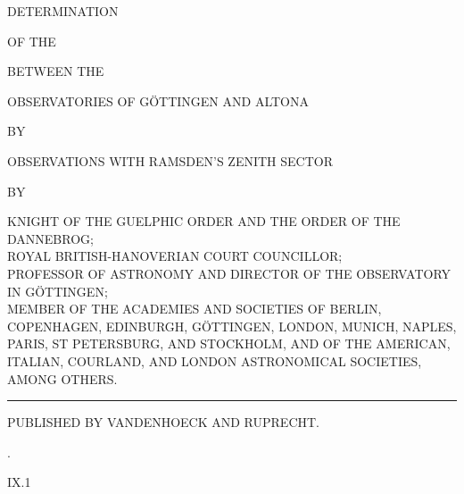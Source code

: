 \clearpage
\begin{center}
{\Large DETERMINATION}\par\vspace{8mm}
{\small OF THE}\par\vspace{8mm}
{\LARGE{}}\par\vspace{8mm}
{\small BETWEEN THE}\par\vspace{7mm}
{\large OBSERVATORIES OF GÖTTINGEN AND ALTONA}\par\vspace{7mm}
{\small BY}\par\vspace{7mm}
{\normalsize OBSERVATIONS WITH RAMSDEN'S ZENITH SECTOR}\par\vspace{7mm}
{\small BY}\par\vspace{7mm}
{\large{}}\par\smallskip
{\scriptsize
KNIGHT OF THE GUELPHIC ORDER AND THE ORDER OF THE DANNEBROG;\\
ROYAL BRITISH-HANOVERIAN COURT COUNCILLOR;\\
PROFESSOR OF ASTRONOMY AND DIRECTOR OF THE OBSERVATORY IN GÖTTINGEN;\\
MEMBER OF THE ACADEMIES AND SOCIETIES OF BERLIN, COPENHAGEN, EDINBURGH, GÖTTINGEN,
LONDON, MUNICH, NAPLES, PARIS, ST PETERSBURG, AND STOCKHOLM, AND OF THE
AMERICAN, ITALIAN, COURLAND, AND LONDON ASTRONOMICAL SOCIETIES, AMONG OTHERS.
}\par\vspace{15mm}
\rule{.35\textwidth}{.4pt}\par\medskip
{\large{}}\par\medskip
PUBLISHED BY VANDENHOECK AND RUPRECHT.\par{}.
\end{center}
\vfill\noindent IX.\hfill 1\par

\clearpage
\null

